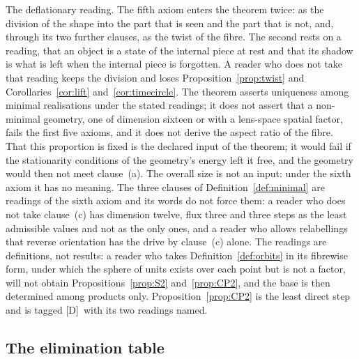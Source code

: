 \documentclass[11pt,a4paper]{article}
\theoremstyle{plain}
\theoremstyle{definition}
\theoremstyle{remark}
\newcommand{\rigD}{[\textup{D}]}
\begin{document}
The deflationary reading. The fifth axiom enters the theorem twice: as the division of the shape into the part that is seen and the part that is not, and, through its two further clauses, as the twist of the fibre. The second rests on a reading, that an object is a state of the internal piece at rest and that its shadow is what is left when the internal piece is forgotten. A reader who does not take that reading keeps the division and loses Proposition~\ref{prop:twist} and Corollaries~\ref{cor:lift} and~\ref{cor:timecircle}. The theorem asserts uniqueness among minimal realisations under the stated readings; it does not assert that a non-minimal geometry, one of dimension sixteen or with a lens-space spatial factor, fails the first five axioms, and it does not derive the aspect ratio of the fibre. That this proportion is fixed is the declared input of the theorem; it would fail if the stationarity conditions of the geometry's energy left it free, and the geometry would then not meet clause~(a). The overall size is not an input: under the sixth axiom it has no meaning. The three clauses of Definition~\ref{def:minimal} are readings of the sixth axiom and its words do not force them: a reader who does not take clause~(c) has dimension twelve, flux three and three steps as the least admissible values and not as the only ones, and a reader who allows relabellings that reverse orientation has the drive by clause~(c) alone. The readings are definitions, not results: a reader who takes Definition~\ref{def:orbits} in its fibrewise form, under which the sphere of units exists over each point but is not a factor, will not obtain Propositions~\ref{prop:S2} and~\ref{prop:CP2}, and the base is then determined among products only. Proposition~\ref{prop:CP2} is the least direct step and is tagged \rigD\ with its two readings named.

\subsection{The elimination table}
\end{document}
